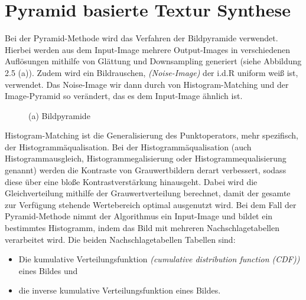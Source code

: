 \documentclass[12pt, a4paper,twoside,openright]{report} %
\begin{document}
\section{Pyramid basierte Textur Synthese}

Bei der Pyramid-Methode wird das Verfahren der Bildpyramide verwendet.
Hierbei werden aus dem Input-Image mehrere Output-Images in verschiedenen Auflösungen mithilfe von Glättung und Downsampling generiert {(siehe Abbildung 2.5 (a))}. \cite{Heeger}
\newline
Zudem wird ein Bildrauschen, \textit{(Noise-Image)} der i.d.R uniform weiß ist, verwendet.
Das Noise-Image wir dann durch von Histogram-Matching und der Image-Pyramid so verändert, das es dem Input-Image ähnlich ist.

\begin{figure}[H]
    \centering
    \caption{(a) Bildpyramide}%
\end{figure}

Histogram-Matching ist die Generalisierung des Punktoperators, mehr spezifisch, der Histogrammäqualisation.
Bei der Histogrammäqualisation {(auch Histogrammausgleich, Histogrammegalisierung oder Histogrammequalisierung genannt)}
werden die Kontraste von Grauwertbildern derart verbessert, sodass diese über eine bloße Kontrastverstärkung hinausgeht.
Dabei wird die Gleichverteilung mithilfe der Grauwertverteilung berechnet, damit der gesamte zur Verfügung stehende Wertebereich optimal ausgenutzt wird. \cite{Lehmann2013}
Bei dem Fall der Pyramid-Methode nimmt der Algorithmus ein Input-Image und bildet ein bestimmtes Histogramm, indem das Bild mit mehreren Nachschlagetabellen verarbeitet wird.
Die beiden Nachschlagetabellen Tabellen sind:

\begin{itemize}
    \itemsep-0.5em
    \item Die kumulative Verteilungsfunktion \textit{(cumulative distribution function (CDF))} eines Bildes und
    \item die inverse kumulative Verteilungsfunktion eines Bildes.
\end{itemize} 
\end{document}
